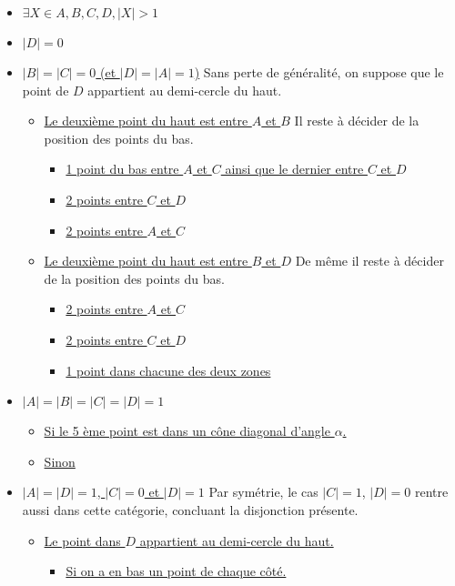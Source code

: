 \begin{itemize}
	\item \hyperref[1cas]{$\exists X \in {A,B,C,D}, |X| > 1$}
	\item \hyperref[2cas]{$|D| = 0$}
	\item \hyperref[3cas]{$|B| = |C| = 0$ (et $|D| = |A| = 1$)}
	Sans perte de généralité, on suppose que le point de $D$ appartient au demi-cercle du haut.
	\begin{itemize}
		\item \hyperref[3cas1]{Le deuxième point du haut est entre $A$ et $B$}
		Il reste à décider de la position des points du bas.
		\begin{itemize}
			\item \hyperref[3cas11]{1 point du bas entre $A$ et $C$ ainsi que le dernier entre $C$ et $D$}
			\item \hyperref[3cas12]{2 points entre $C$ et $D$}
			\item \hyperref[3cas13]{2 points entre $A$ et $C$}
		\end{itemize}
		\item \hyperref[3cas2]{Le deuxième point du haut est entre $B$ et $D$}
		De même il reste à décider de la position des points du bas.
		\begin{itemize}
			\item \hyperref[3cas21]{2 points entre $A$ et $C$}
			\item \hyperref[3cas22]{2 points entre $C$ et $D$}
			\item \hyperref[3cas23]{1 point dans chacune des deux zones}
		\end{itemize}
	\end{itemize}
	\item \hyperref[4cas]{$|A| = |B| = |C| = |D| = 1$}
	\begin{itemize}
		\item \hyperref[4cas1]{Si le 5 ème point est dans un cône diagonal d'angle $\alpha$.}
		\item \hyperref[4cas2]{Sinon}
	\end{itemize}
	\item \hyperref[5cas]{$|A| = |D| = 1$, $|C| = 0$ et $|D| = 1$}
		Par symétrie, le cas $|C| = 1$, $|D| = 0$ rentre aussi dans cette catégorie, concluant la disjonction présente.
	\begin{itemize}
		\item \hyperref[5cas1]{Le point dans $D$ appartient au demi-cercle du haut.}
		\begin{itemize}
			\item \hyperref[5cas11]{Si on a en bas un point de chaque côté.}

\end{itemize}
\end{itemize}
\end{itemize}
